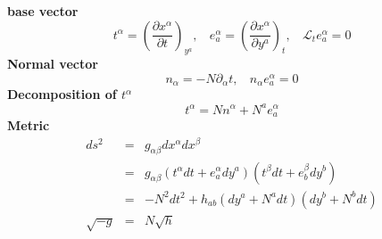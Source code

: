 \documentclass{article}
\begin{document}
\textbf{base vector}
\[t^{\alpha} = \left( \frac{\partial x^{\alpha}}{\partial t}\right)_{y^a}, \ \ \ \ e_a^{\alpha} = \left(\frac{\partial x^{\alpha}}{\partial y^a} \right)_t, \ \ \ \ \mathcal{L}_t e_a^{\alpha} = 0\]
\textbf{Normal vector}
\[n_{\alpha} = -N \partial_{\alpha}t, \ \ \ \ n_{\alpha} e_a^{\alpha} = 0\]
\textbf{Decomposition of $t^{\alpha}$}
\[t^{\alpha} = N n^{\alpha} + N^a e_a^{\alpha}\]
\textbf{Metric}
\begin{eqnarray}
ds^2 &=& g_{\alpha \beta} dx^{\alpha} dx^{\beta} \nonumber \\
&=& g_{\alpha \beta} (t^{\alpha} dt + e_a^{\alpha}dy^a) (t^{\beta} dt + e_b^{\beta}dy^{b}) \nonumber \\
&=& -N^2 dt^2 + h_{ab}(dy^a+N^a dt)(dy^b + N^b dt) \nonumber \\
\sqrt{-g} &=& N \sqrt{h} \nonumber
\end{eqnarray}
\end{document}
